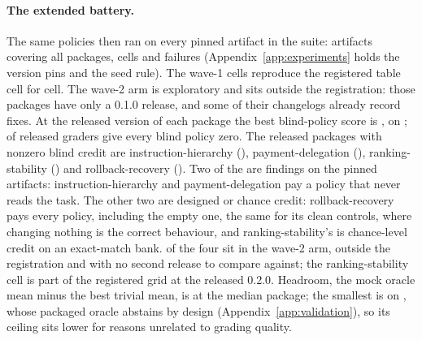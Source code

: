 \paragraph{The extended battery.}
The same \expPolicies{} policies then ran on every pinned artifact in the suite: \expArtifacts{} artifacts covering all \expPackages{} packages, \expCells{} cells and \expFailedCells{} failures (Appendix~\ref{app:experiments} holds the version pins and the seed rule). The wave-1 cells reproduce the registered table cell for cell. The wave-2 arm is exploratory and sits outside the registration: those packages have only a 0.1.0 release, and some of their changelogs already record fixes. At the released version of each package the best blind-policy score is \expTrivialReleasedMax{}, on \expTrivialReleasedMaxPkgs{}; \expTrivialReleasedZero{} of \expPackages{} released graders give every blind policy zero. The \expTrivialReleasedNonzero{} released packages with nonzero blind credit are instruction-hierarchy (\expTrivInstructionHierarchyRel{}), payment-delegation (\expTrivPaymentDelegationRel{}), ranking-stability (\expTrivRankingStabilityNew{}) and rollback-recovery (\expTrivRollbackRecoveryRel{}). Two of the \expTrivialReleasedNonzero{} are findings on the pinned artifacts: instruction-hierarchy and payment-delegation pay a policy that never reads the task. The other two are designed or chance credit: rollback-recovery pays every policy, including the empty one, the same \expTrivRollbackRecoveryRel{} for its clean controls, where changing nothing is the correct behaviour, and ranking-stability's \expTrivRankingStabilityNew{} is chance-level credit on an exact-match bank. \expWaveTwoNonzero{} of the four sit in the wave-2 arm, outside the registration and with no second release to compare against; the ranking-stability cell is part of the registered grid at the released 0.2.0. Headroom, the mock oracle mean minus the best trivial mean, is \expHeadroomMedian{} at the median package; the smallest is \expHeadroomMin{} on \expOracleBelowOnePkgs{}, whose packaged oracle abstains by design (Appendix~\ref{app:validation}), so its ceiling sits lower for reasons unrelated to grading quality.

